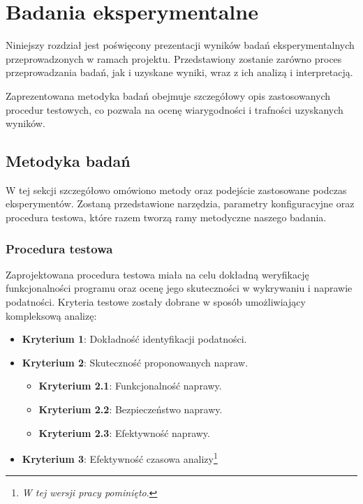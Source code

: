\chapter{Badania eksperymentalne}

Niniejszy rozdział jest poświęcony prezentacji wyników badań eksperymentalnych przeprowadzonych w ramach projektu. Przedstawiony zostanie zarówno proces przeprowadzania badań, jak i uzyskane wyniki, wraz z ich analizą i interpretacją.

Zaprezentowana metodyka badań obejmuje szczegółowy opis zastosowanych procedur testowych, co pozwala na ocenę wiarygodności i trafności uzyskanych wyników.

\section{Metodyka badań}

W tej sekcji szczegółowo omówiono metody oraz podejście zastosowane podczas eksperymentów. 
Zostaną przedstawione narzędzia, parametry konfiguracyjne oraz procedura testowa, które razem tworzą ramy metodyczne naszego badania.

\subsection{Procedura testowa}

Zaprojektowana procedura testowa miała na celu dokładną weryfikację funkcjonalności programu oraz ocenę jego skuteczności w wykrywaniu i naprawie podatności. Kryteria testowe zostały dobrane w sposób umożliwiający kompleksową analizę:

\begin{itemize}
    \item \textbf{Kryterium 1}: Dokładność identyfikacji podatności.
    \item \textbf{Kryterium 2}: Skuteczność proponowanych napraw.
      \begin{itemize}
        \item \textbf{Kryterium 2.1}: Funkcjonalność naprawy.
        \item \textbf{Kryterium 2.2}: Bezpieczeństwo naprawy.
        \item \textbf{Kryterium 2.3}: Efektywność naprawy.
      \end{itemize}
    \item \textbf{Kryterium 3}: Efektywność czasowa analizy\footnote{\textit{W tej wersji pracy pominięto}.}
\end{itemize}

